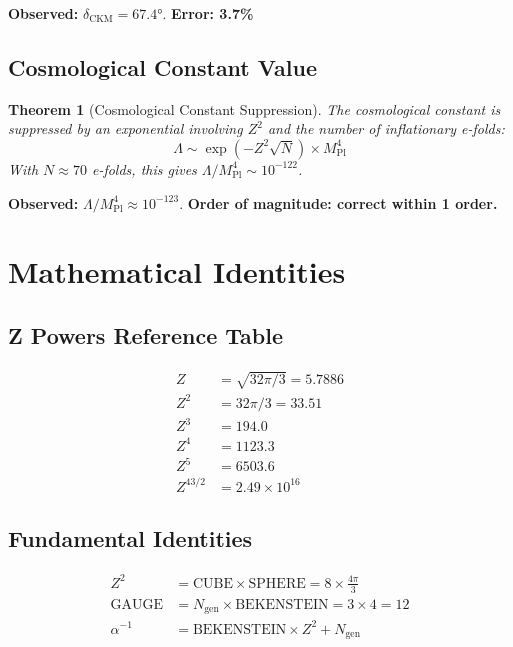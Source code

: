 \documentclass[11pt,a4paper]{article}
\theoremstyle{plain}
\newtheorem{theorem}{Theorem}[section]
\theoremstyle{definition}
\theoremstyle{remark}
\newcommand{\Mpl}{M_{\text{Pl}}}
\newcommand{\Ngen}{N_{\text{gen}}}
\begin{document}
\textbf{Observed:} $\delta_{\text{CKM}} = 67.4°$. \textbf{Error: 3.7\%}

\subsection{Cosmological Constant Value}

\begin{theorem}[Cosmological Constant Suppression]
The cosmological constant is suppressed by an exponential involving $Z^2$ and the number of inflationary e-folds:
\begin{equation}
\boxed{\Lambda \sim \exp(-Z^2 \sqrt{N}) \times \Mpl^4}
\end{equation}
With $N \approx 70$ e-folds, this gives $\Lambda/\Mpl^4 \sim 10^{-122}$.
\end{theorem}

\textbf{Observed:} $\Lambda/\Mpl^4 \approx 10^{-123}$. \textbf{Order of magnitude: correct within 1 order.}

\appendix
\section{Mathematical Identities}

\subsection{Z Powers Reference Table}

\begin{align}
Z &= \sqrt{32\pi/3} = 5.7886 \\
Z^2 &= 32\pi/3 = 33.51 \\
Z^3 &= 194.0 \\
Z^4 &= 1123.3 \\
Z^5 &= 6503.6 \\
Z^{43/2} &= 2.49 \times 10^{16}
\end{align}

\subsection{Fundamental Identities}

\begin{align}
Z^2 &= \text{CUBE} \times \text{SPHERE} = 8 \times \frac{4\pi}{3} \\
\text{GAUGE} &= \Ngen \times \text{BEKENSTEIN} = 3 \times 4 = 12 \\
\alpha^{-1} &= \text{BEKENSTEIN} \times Z^2 + \Ngen
\end{align}
\end{document}
